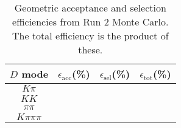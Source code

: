\begin{table}[H]
    \centering
    \begin{tabular}{cccc}
        \toprule
        $D$ mode & $\epsilon_\mathrm{acc}$(\%) &  $\epsilon_\mathrm{sel}$(\%) &  $\epsilon_\mathrm{tot}$(\%) \\
        \midrule
        $K\pi$ &  &  &  \\
        $KK$ &  &  &  \\
        $\pi\pi$ &  &  &  \\
        $K\pi\pi\pi$ &  &  &  \\
        \bottomrule
    \end{tabular}
    \caption{Geometric acceptance and selection efficiencies from  Run 2 Monte Carlo. The total efficiency is the  product of these.}
\label{tab:selection_efficiency_}
\end{table}
